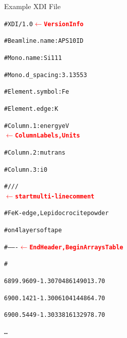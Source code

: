 \documentclass[final]{beamer}
\newcommand{\Color}[2]{{\textcolor{#1}{#2}}}
\newcommand{\BoldRed}[1]{{\Color{Red}{\bf{#1}}}}
\begin{document}
\begin{frame}{}
\begin{columns}[t]
      \begin{column}{.44\linewidth}
        \begin{block}{Example XDI File}
          \begin{center}
            \begin{minipage}[t]{0.95\linewidth}
              \begin{alltt}
                {\footnotesize
                  \#XDI/1.0  {\BoldRed{$\leftarrow$ Version Info}}\par
                  \#Beamline.name: APS 10ID\par
                  \#Mono.name:  Si 111\par
                  \#Mono.d\_spacing: 3.13553\par
                  \#Element.symbol: Fe\par
                  \#Element.edge: K\par
                  \#Column.1: energy eV
                  {\BoldRed{$\leftarrow$ Column Labels, Units}}\par
                  \#Column.2: mutrans\par
                  \#Column.3: i0\par
                  \#///
                  {\BoldRed{$\leftarrow$ start multi-line comment}}\par
                  \#Fe K-edge, Lepidocrocite powder\par
                  \#on 4 layers of tape\par
                  \#------- {\BoldRed{$\leftarrow$ End Header, Begin Arrays Table}}\par
                  \#\par
                  \hspace{3mm} 6899.9609 -1.3070486 149013.70\par
                  \hspace{3mm} 6900.1421 -1.3006104 144864.70\par
                  \hspace{3mm} 6900.5449 -1.3033816 132978.70\par
                  \hspace{3mm} \ldots\par
                }
              \end{alltt}
            \end{minipage}
          \end{center}
        \end{block}


\end{column}
\end{columns}
\end{frame}
\end{document}
